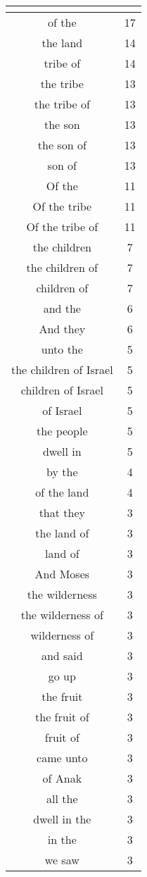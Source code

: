 \begin{center}
\begin{longtable}{|c|c|}
\hline \multicolumn{2}{c}{{ }} \\ \hline
\endfoot 
of the & 17\\ \hline 
the land & 14\\ \hline 
tribe of & 14\\ \hline 
the tribe & 13\\ \hline 
the tribe of & 13\\ \hline 
the son & 13\\ \hline 
the son of & 13\\ \hline 
son of & 13\\ \hline 
Of the & 11\\ \hline 
Of the tribe & 11\\ \hline 
Of the tribe of & 11\\ \hline 
the children & 7\\ \hline 
the children of & 7\\ \hline 
children of & 7\\ \hline 
and the & 6\\ \hline 
And they & 6\\ \hline 
unto the & 5\\ \hline 
the children of Israel & 5\\ \hline 
children of Israel & 5\\ \hline 
of Israel & 5\\ \hline 
the people & 5\\ \hline 
dwell in & 5\\ \hline 
by the & 4\\ \hline 
of the land & 4\\ \hline 
that they & 3\\ \hline 
the land of & 3\\ \hline 
land of & 3\\ \hline 
And Moses & 3\\ \hline 
the wilderness & 3\\ \hline 
the wilderness of & 3\\ \hline 
wilderness of & 3\\ \hline 
and said & 3\\ \hline 
go up & 3\\ \hline 
the fruit & 3\\ \hline 
the fruit of & 3\\ \hline 
fruit of & 3\\ \hline 
came unto & 3\\ \hline 
of Anak & 3\\ \hline 
all the & 3\\ \hline 
dwell in the & 3\\ \hline 
in the & 3\\ \hline 
we saw & 3\\ \hline 
\end{longtable}
\end{center}





